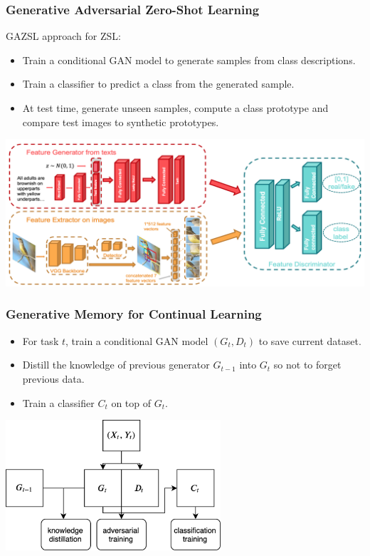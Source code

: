 \documentclass[10pt]{beamer}
\begin{document}
\begin{frame}
    \frametitle{Generative Adversarial Zero-Shot Learning \cite{GAZSL}}
    
    GAZSL approach for ZSL:
    \begin{itemize}
        \item Train a conditional GAN model to generate samples from class descriptions.
        \item Train a classifier to predict a class from the generated sample.
        \item At test time, generate unseen samples, compute a class prototype and compare test images to synthetic prototypes.
    \end{itemize}
    
    \centering
    \includegraphics[width=\textwidth]{images/gazsl}
\end{frame}

\begin{frame}
    \frametitle{Generative Memory for Continual Learning \cite{MeRGAN}}
    
    \begin{itemize}
        \item For task $t$, train a conditional GAN model $(G_t, D_t)$ to save current dataset.
        \item Distill the knowledge of previous generator $G_{t-1}$ into $G_t$ so not to forget previous data.
        \item Train a classifier $C_t$ on top of $G_t$.
    \end{itemize}
    
    \vspace{0.5cm}
    \centering
    \includegraphics[width=0.6\textwidth]{images/genmem}
\end{frame}
\end{document}
